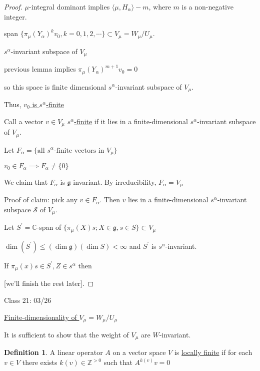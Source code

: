 \documentclass{article}
\theoremstyle{definition}
\newtheorem{definition}{Definition}
\begin{document}
\begin{proof}
    \(\mu\)-integral dominant implies \(\langle \mu, H_\alpha \rangle - m\), where \(m\) is a non-negative integer.
    
    span \(\{ \pi_\mu(Y_\alpha)^k v_0, k = 0,1,2,\cdots\} \subset V_\mu = W_\mu / U_\mu\).
    
    \(s^\alpha\)-invariant subspace of \(V_\mu\) 
    
    previous lemma implies \(\pi_\mu(Y_\alpha)^{m+1} v_0 = 0\)
    
    so this space is finite dimensional \(s^\alpha\)-invariant subspace of \(V_\mu\).
    
    Thus, \underline{\(v_0\) is \(s^\alpha\)-finite}
    
    Call a vector \(v\in V_\mu\) \underline{\(s^\alpha\)-finite} if it lies in a finite-dimensional \(s^\alpha\)-invariant subspace of \(V_\mu\).
    
    Let \(F_\alpha = \{ \text{all } s^\alpha \text{-finite vectors in } V_\mu \} \)
    
    \(v_0\in F_\alpha \implies F_\alpha \neq \{ 0 \} \)
    
    We claim that \(F_\alpha\) is \(\mathfrak{g}\)-invariant. By irreducibility, \(F_\alpha = V_\mu\)
    
    Proof of claim: pick any \(v\in F_\alpha\). Then \(v\) lies in a finite-dimensional \(s^\alpha\)-invariant subspace \(\mathcal{S}\) of \(V_\mu\).
    
    Let \(S^{\prime}=\mathbb{C}\)-span of \(\{ \pi_\mu(X)s; X\in \mathfrak{g} , s\in S \} \subset V_\mu \)
    
    \(\dim (S^{\prime} ) \leq (\dim \mathfrak{g})(\dim S) < \infty\) and \(S^{\prime}\) is \(s^\alpha\)-invariant.
    
    If \(\pi_\mu(x)s\in S^{\prime}, Z\in s^\alpha\) then
    
    [we'll finish the rest later]. 
\end{proof}

\hrulefill

Class 21: 03/26

\underline{Finite-dimensionality of \(V_\mu = W_\mu / U_\mu\) } 

It is sufficient to show that the weight of \(V_\mu\) are \(W\)-invariant.

\begin{definition}
    A linear operator \(A\) on a vector space \(V\) is \underline{locally finite} if for each \(v\in V\) there exists \(k(v)\in\mathbb{Z}^{>0}\) such that \(A^{k(v)}v=0\)  
\end{definition}
\end{document}
